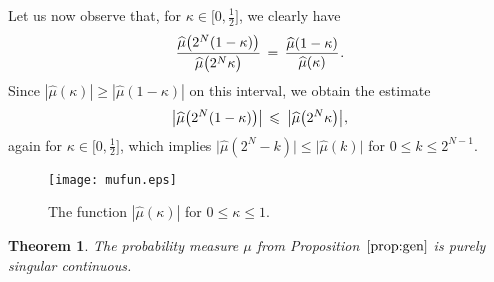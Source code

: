 \documentclass[11pt,a4paper]{amsart}
\theoremstyle{plain}
\newtheorem{theorem}{Theorem}[section]
\theoremstyle{definition}
\numberwithin{equation}{section}
\newcommand{\ts}{\hspace{0.5pt}}
\begin{document}
Let us now observe that, for
$\kappa\in \bigl[ 0, \frac{1}{2} \bigr]$, we clearly have
\begin{equation}\label{eq:2Nkratio-1}
  \frac{\widehat{\mu} \bigl(2^N (1-\kappa )\bigr)}
       {\widehat{\mu} \bigl(2^N \kappa \bigr)}
  \, = \, \frac{\widehat{\mu} (1-\kappa )}
          {\widehat{\mu} (\kappa )} \ts .
\end{equation}
Since $|\widehat{\mu} (\kappa )| \geqslant |\widehat{\mu} 
(1-\kappa )|$ on this interval, we obtain the estimate
\begin{equation}\label{eq:2Nkratio}
   \big\lvert \widehat{\mu} \bigl( 2^N(1- \kappa ) \bigr) 
   \big\rvert  \, \leqslant \:
   \big\lvert \widehat{\mu} \bigl( 2^N \kappa \bigr) 
   \big\rvert \ts ,
\end{equation}
again for $\kappa \in \bigl[ 0, \frac{1}{2} \bigr]$, which implies
$\big\lvert \widehat{\mu} (2^N \! - k)\big\rvert \leqslant \big\lvert
\widehat{\mu} (k)\big\rvert$ for $0\leqslant k \leqslant 2^{N-1}$.

\begin{figure}
  \texttt{[image: mufun.eps]}
\caption{The function $|\widehat{\mu} (\kappa)|$ for
  $0 \leqslant \kappa \leqslant 1$.\label{fig:muk01}}
\end{figure}

\begin{theorem}\label{thm:cont}
  The probability measure\/ $\mu$ from Proposition~\emph{$\ref{prop:gen}$} 
  is purely singular continuous.
\end{theorem}
\end{document}
